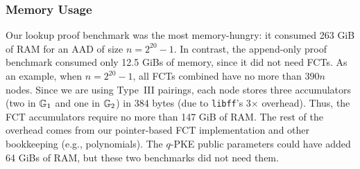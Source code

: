 \subsubsection{Memory Usage}
\label{s:eval:memory}
\newcommand{\frontierOverhead}{390}
Our lookup proof benchmark was the most memory-hungry: it consumed 263 GiB of RAM for an AAD of size $n = 2^{20}-1$.
In contrast, the append-only proof benchmark consumed only 12.5 GiBs of memory, since it did not need FCTs.
As an example, when $n = 2^{20} - 1$, all FCTs combined have no more than $\frontierOverhead n$ nodes.
Since we are using Type~III pairings, each node stores three accumulators (two in $\mathbb{G}_1$ and one in $\mathbb{G}_2$) in 384 bytes (due to \texttt{libff}'s 3$\times$ overhead).
Thus, the FCT accumulators require no more than 147 GiB of RAM.
%
The rest of the overhead comes from our pointer-based FCT implementation and other bookkeeping (e.g., polynomials).
The $q$-PKE public parameters could have added 64 GiBs of RAM, but these two benchmarks did not need them.

